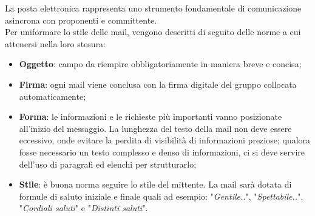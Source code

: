 \documentclass[10pt, a4paper]{article}
\begin{document}
    La posta elettronica rappresenta uno strumento fondamentale di comunicazione asincrona con proponenti e 
    committente.\\ 
    Per uniformare lo stile delle mail, vengono descritti di seguito delle norme a cui attenersi nella loro stesura:
    \begin{itemize}
        \item \textbf{Oggetto}: campo da riempire obbligatoriamente in maniera breve e concisa;
        \item \textbf{Firma}: ogni mail viene conclusa con la firma digitale del gruppo collocata automaticamente;
        \item \textbf{Forma}: le informazioni e le richieste più importanti vanno posizionate all'inizio del messaggio. La lunghezza del 
        testo della mail non deve essere eccessivo, onde evitare la perdita di visibilità di informazioni preziose; qualora fosse necessario un testo complesso e denso di informazioni, ci si deve servire dell'uso di paragrafi ed elenchi per strutturarlo;
        \item \textbf{Stile}: è buona norma seguire lo stile del mittente. La mail sarà dotata di formule di saluto iniziale e finale quali 
        ad esempio: "\textit{Gentile..}", "\textit{Spettabile..}", "\textit{Cordiali saluti}" e "\textit{Distinti saluti}".
    \end{itemize}
    
\end{document}
